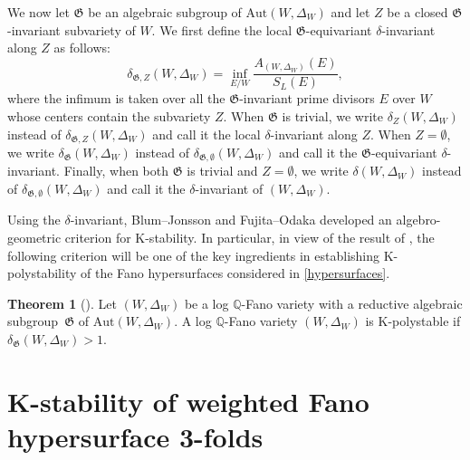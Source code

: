 \documentclass[12pt]{amsart}
\theoremstyle{definition}
\newtheorem{theorem}[equation]{Theorem}
\theoremstyle{remark}
\begin{document}
We now let $\mathfrak{G}$ be an algebraic subgroup of $\mathrm{Aut}(W,\Delta_W)$ and let $Z$ be a closed $\mathfrak{G}$-invariant subvariety of $W$. We first define the local $\mathfrak{G}$-equivariant $\delta$-invariant along $Z$ as follows:
\[\delta_{\mathfrak{G}, Z}(W,\Delta_W)=\inf_{E/W}\frac{A_{(W,\Delta_W)}(E)}{S_{L}(E)},\]
where the infimum is taken  over all the $\mathfrak{G}$-invariant prime divisors $E$ over $W$ whose centers contain the subvariety $Z$.
When $\mathfrak{G}$ is trivial, we write $\delta_Z(W,\Delta_W)$ instead of $\delta_{\mathfrak{G},Z}(W,\Delta_W)$ and call it the local $\delta$-invariant along $Z$. When $Z=\emptyset$, we write $\delta_{\mathfrak{G}}(W,\Delta_W)$ instead of $\delta_{\mathfrak{G},\emptyset}(W,\Delta_W)$ and call it the $\mathfrak{G}$-equivariant $\delta$-invariant. Finally, when both $\mathfrak{G}$ is trivial and $Z=\emptyset$, we write $\delta(W,\Delta_W)$ instead of $\delta_{\mathfrak{G},\emptyset}(W,\Delta_W)$ and call it the $\delta$-invariant of $(W,\Delta_W)$.

Using the $\delta$-invariant, Blum–Jonsson \cite{Blum-Jonsson17} and Fujita–Odaka \cite{Fujita-Odaka16} developed an algebro-geometric criterion for K-stability. In particular, in view of the result of \cite{Z21}, the following criterion will be one of the key ingredients in establishing K-polystability of the Fano hypersurfaces considered in \eqref{hypersurfaces}.

\begin{theorem}[{\cite[Corollary~4.14]{Z21}}]\label{theorem:G-delta}
Let $(W, \Delta_W)$ be a  log $\mathbb{Q}$-Fano variety with a reductive algebraic subgroup~$\mathfrak{G}$ of $\mathrm{Aut}(W, \Delta_W)$.
A log $\mathbb{Q}$-Fano variety $(W, \Delta_W)$ is K-polystable  if $\delta_\mathfrak{G}(W, \Delta_W)>1$.
\end{theorem}




 \section{K-stability of weighted Fano hypersurface 3-folds}\label{section:K-polystability}
\end{document}
